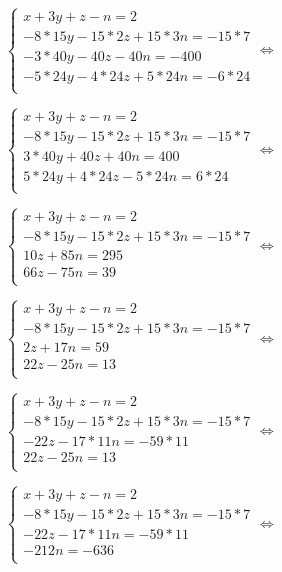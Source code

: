 \begin{enumerate}
\begin{multicols}{2}
	$ \begin{cases}
	x + 3y + z - n = 2 \\
	 -8*15y - 15*2z + 15*3n = -15*7\\
	 -3*40y -40z -40n = -400\\
	  -5*24y - 4*24z + 5*24n = -6*24\\
	\end{cases}  \Longleftrightarrow $

	$ \begin{cases}
	x + 3y + z - n = 2 \\
	 -8*15y - 15*2z + 15*3n = -15*7\\
	 3*40y +40z +40n = 400\\
	  5*24y + 4*24z - 5*24n = 6*24\\
	\end{cases}  \Longleftrightarrow $

	$ \begin{cases}
	x + 3y + z - n = 2 \\
	 -8*15y - 15*2z + 15*3n = -15*7\\
	 10z +85n = 295\\
	  66z - 75n = 39\\
	\end{cases}  \Longleftrightarrow $

	$ \begin{cases}
	x + 3y + z - n = 2 \\
	 -8*15y - 15*2z + 15*3n = -15*7\\
	  2z +17n = 59\\
	  22z - 25n = 13\\
	\end{cases}  \Longleftrightarrow $

	$ \begin{cases}
	x + 3y + z - n = 2 \\
	 -8*15y - 15*2z + 15*3n = -15*7\\
	  -22z -17*11n = -59*11\\
	  22z - 25n = 13\\
	\end{cases}  \Longleftrightarrow $

	$ \begin{cases}
	x + 3y + z - n = 2 \\
	 -8*15y - 15*2z + 15*3n = -15*7\\
	  -22z -17*11n = -59*11\\
	   - 212n = -636\\
	\end{cases}  \Longleftrightarrow $


\end{multicols}
\end{enumerate}
